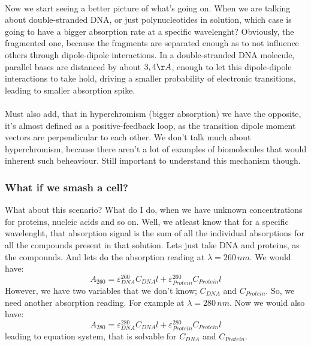 \documentclass[12pt,  letterpaper]{article}
\begin{document}
\paragraph*{}
Now we start seeing a better picture of what's going on. When we are talking about double-stranded DNA, or just polynucleotides in solution, which case is going to have a bigger absorption rate at a specific wavelenght? Obviously, the fragmented one, because the fragments are separated enough as to not influence others through dipole-dipole interactions. In a double-stranded DNA molecule, parallel bases are distanced by about $3,4 \AA$, enough to let this dipole-dipole interactions to take hold, driving a smaller probability of electronic transitions, leading to smaller absorption spike.\paragraph*{}
Must also add, that in hyperchromism (bigger absorption) we have the opposite, it's almost defined as a positive-feedback loop, as the transition dipole moment vectors are perpendicular to each other. We don't talk much about hyperchromism, because there aren't a lot of examples of biomolecules that would inherent such beheaviour. Still important to understand this mechanism though.
\paragraph*{}
\subsubsection*{What if we smash a cell?}
What about this scenario? What do I do, when we have unknown concentrations for proteins, nucleic acids and so on. Well, we atleast know that for a specific wavelenght, that absorption signal is the sum of all the individual absorptions for all the compounds present in that solution. Lets just take DNA and proteins, as the compounds. And lets do the absorption reading at $\lambda = 260\,nm$. We would have:
\begin{equation}
A_{260} = \varepsilon_{DNA}^{260}C_{DNA}l + \varepsilon_{Protein}^{260}C_{Protein}l
\end{equation}
However, we have two variables that we don't know; $C_{DNA}$ and $C_{Protein}$. So, we need another absorption reading. For example at $\lambda = 280\,nm$. Now we would also have:
\begin{equation}
A_{280} = \varepsilon_{DNA}^{280}C_{DNA}l + \varepsilon_{Protein}^{280}C_{Protein}l
\end{equation}
leading to equation system, that is solvable for $C_{DNA}$ and $C_{Protein}$.
\end{document}
